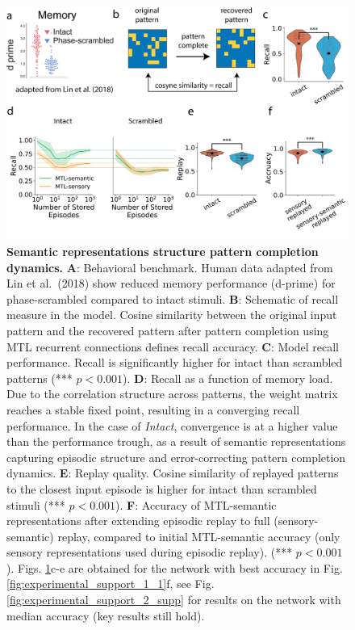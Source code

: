 \documentclass{article}
\begin{document}
\begin{figure}
    \centering
    \includegraphics[width=0.95\linewidth]{Figures/Figure_6.png}
\caption{\textbf{Semantic representations structure pattern completion dynamics.} \textbf{A}: Behavioral benchmark. Human data adapted from Lin et al.\ (2018) show reduced memory performance (d-prime) for phase-scrambled compared to intact stimuli.  
\textbf{B}: Schematic of recall measure in the model. Cosine similarity between the original input pattern and the recovered pattern after pattern completion using MTL recurrent connections defines recall accuracy.  
\textbf{C}: Model recall performance. Recall is significantly higher for intact than scrambled patterns (*** $p<0.001$).  
\textbf{D}: Recall as a function of memory load. Due to the correlation structure across patterns, the weight matrix reaches a stable fixed point, resulting in a converging recall performance. In the case of \textit{Intact}, convergence is at a higher value than the performance trough, as a result of semantic representations capturing episodic structure and error-correcting pattern completion dynamics.
\textbf{E}: Replay quality. Cosine similarity of replayed patterns to the closest input episode is higher for intact than scrambled stimuli (*** $p<0.001$).  
\textbf{F}: Accuracy of MTL-semantic representations after extending episodic replay to full (sensory-semantic) replay, compared to initial MTL-semantic accuracy (only sensory representations used during episodic replay). (*** $p<0.001$). Figs. \ref{fig:experimental_support_2}c-e are obtained for the network with best accuracy in Fig. \ref{fig:experimental_support_1_1}f, see Fig. \ref{fig:experimental_support_2_supp} for results on the network with median accuracy (key results still hold).}
    \label{fig:experimental_support_2}
\end{figure}
\end{document}
